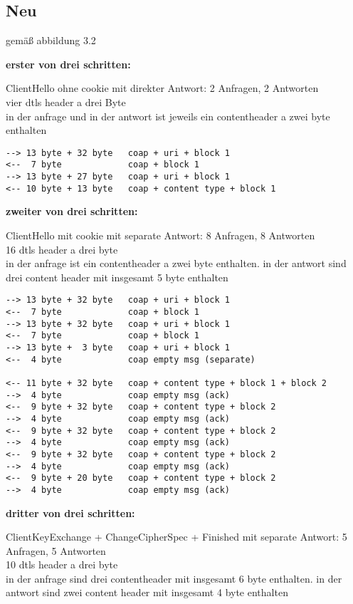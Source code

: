 \subsection{Neu}

gemäß abbildung 3.2

\textbf{erster von drei schritten:}

ClientHello ohne cookie mit direkter Antwort: 2 Anfragen, 2 Antworten\\
vier dtls header a drei Byte\\
in der anfrage und in der antwort ist jeweils ein contentheader a zwei byte enthalten

\begin{verbatim}
--> 13 byte + 32 byte   coap + uri + block 1
<--  7 byte             coap + block 1
--> 13 byte + 27 byte   coap + uri + block 1
<-- 10 byte + 13 byte   coap + content type + block 1
\end{verbatim}

\textbf{zweiter von drei schritten:}

ClientHello mit cookie mit separate Antwort: 8 Anfragen, 8 Antworten\\
16 dtls header a drei byte\\
in der anfrage ist ein contentheader a zwei byte enthalten. in der antwort sind drei content header mit insgesamt 5 byte enthalten

\begin{verbatim}
--> 13 byte + 32 byte   coap + uri + block 1
<--  7 byte             coap + block 1
--> 13 byte + 32 byte   coap + uri + block 1
<--  7 byte             coap + block 1
--> 13 byte +  3 byte   coap + uri + block 1
<--  4 byte             coap empty msg (separate)

<-- 11 byte + 32 byte   coap + content type + block 1 + block 2
-->  4 byte             coap empty msg (ack)
<--  9 byte + 32 byte   coap + content type + block 2
-->  4 byte             coap empty msg (ack)
<--  9 byte + 32 byte   coap + content type + block 2
-->  4 byte             coap empty msg (ack)
<--  9 byte + 32 byte   coap + content type + block 2
-->  4 byte             coap empty msg (ack)
<--  9 byte + 20 byte   coap + content type + block 2
-->  4 byte             coap empty msg (ack)
\end{verbatim}

\textbf{dritter von drei schritten:}

ClientKeyExchange + ChangeCipherSpec + Finished mit separate Antwort: 5 Anfragen, 5 Antworten\\
10 dtls header a drei byte\\
in der anfrage sind drei contentheader mit insgesamt 6 byte enthalten. in der antwort sind zwei content header mit insgesamt 4 byte enthalten

